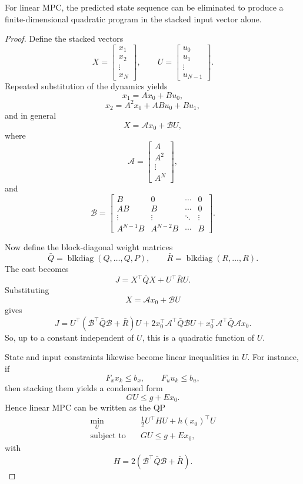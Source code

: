 \begin{theorem}\label{thm:l9-condensing-linear-mpc-into-a-quadratic-program}
	For linear MPC, the predicted state sequence can be eliminated to produce a finite-dimensional quadratic program in the stacked input vector alone.
\end{theorem}
\begin{proof}
	Define the stacked vectors
	\[
		X=
		\begin{bmatrix}
			x_1 \\ x_2 \\ \vdots \\ x_N
		\end{bmatrix},
		\qquad
		U=
		\begin{bmatrix}
			u_0 \\ u_1 \\ \vdots \\ u_{N-1}
		\end{bmatrix}.
	\]
	Repeated substitution of the dynamics yields
	\[
		x_1 = Ax_0 + Bu_0,
	\]
	\[
		x_2 = A^2x_0 + ABu_0 + Bu_1,
	\]
	and in general
	\[
		X = \mathcal{A}x_0 + \mathcal{B}U,
	\]
	where
	\[
		\mathcal{A}
		=
		\begin{bmatrix}
			A \\
			A^2 \\
			\vdots \\
			A^N
		\end{bmatrix},
	\]
	and
	\[
		\mathcal{B}
		=
		\begin{bmatrix}
			B & 0 & \cdots & 0 \\
			AB & B & \cdots & 0 \\
			\vdots & \vdots & \ddots & \vdots \\
			A^{N-1}B & A^{N-2}B & \cdots & B
		\end{bmatrix}.
	\]

	Now define the block-diagonal weight matrices
	\[
		\bar Q = \operatorname{blkdiag}(Q,\dots,Q,P),
		\qquad
		\bar R = \operatorname{blkdiag}(R,\dots,R).
	\]
	The cost becomes
	\[
		J = X^\top \bar Q X + U^\top \bar R U.
	\]
	Substituting
	\[
		X = \mathcal{A}x_0 + \mathcal{B}U
	\]
	gives
	\[
		J
		=
		U^\top(\mathcal{B}^\top \bar Q \mathcal{B} + \bar R)U
		+
		2x_0^\top \mathcal{A}^\top \bar Q \mathcal{B}U
		+
		x_0^\top \mathcal{A}^\top \bar Q \mathcal{A}x_0.
	\]
	So, up to a constant independent of $U$, this is a quadratic function of $U$.

	State and input constraints likewise become linear inequalities in $U$. For instance, if
	\[
		F_x x_k \le b_x,
		\qquad
		F_u u_k \le b_u,
	\]
	then stacking them yields a condensed form
	\[
		GU \le g + E x_0.
	\]
	Hence linear MPC can be written as the QP
	\begin{align*}
		\min_U \quad & \frac{1}{2}U^\top H U + h(x_0)^\top U \\
		\text{subject to}\quad & GU \le g + E x_0,
	\end{align*}
	with
	\[
		H = 2(\mathcal{B}^\top \bar Q \mathcal{B}+\bar R).
	\]
\end{proof}

